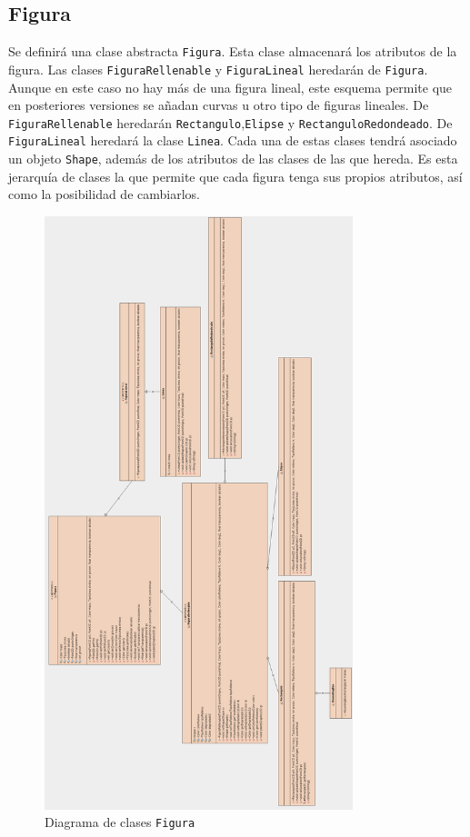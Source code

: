 \subsection{Figura}
Se definirá una clase abstracta \texttt{Figura}. Esta clase almacenará los atributos de la figura. Las clases \texttt{FiguraRellenable} y \texttt{FiguraLineal} heredarán de \texttt{Figura}. Aunque en este caso no hay más de una figura lineal, este esquema permite que en posteriores versiones se añadan curvas u otro tipo de figuras lineales. De \texttt{FiguraRellenable} heredarán \texttt{Rectangulo},\texttt{Elipse} y \texttt{RectanguloRedondeado}. De \texttt{FiguraLineal} heredará la clase \texttt{Linea}. Cada una de estas clases tendrá asociado un objeto \texttt{Shape}, además de los atributos de las clases de las que hereda.\vskip0.3cm
Es esta jerarquía de clases la que permite que cada figura tenga sus propios atributos, así como la posibilidad de cambiarlos.
\vskip0.3cm
\begin{figure}
 \centering
  \includegraphics[width=0.8\textwidth]{diagramas/figura.png}
 \caption{Diagrama de clases \texttt{Figura}}
 \label{diseño}
 \end{figure}

